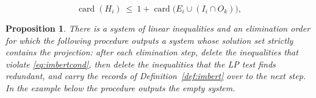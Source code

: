 \documentclass[10pt,a4paper]{amsart}
\newtheorem{proposition}{Proposition}
\newcommand{\card}{\operatorname{card}}
\begin{document}
\begin{equation}
\card(H_i)\ \le\ 1+\card\!\big(E_i\cup(I_i\cap O_k)\big),
\label{eq:imbertcond}
\end{equation}

\begin{proposition}
\label{prop:incompat}
There is a system of linear inequalities and an elimination order for which the following procedure outputs a system whose solution set strictly contains the projection: after each elimination step, delete the inequalities that violate \eqref{eq:imbertcond}, then delete the inequalities that the LP test finds redundant, and carry the records of Definition~\ref{def:imbert} over to the next step. In the example below the procedure outputs the empty system.
\end{proposition}
\end{document}
